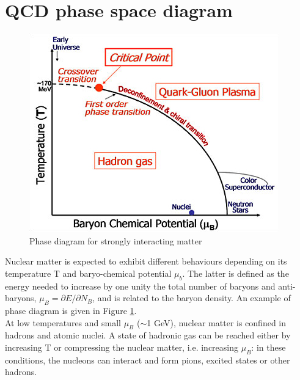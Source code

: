 \section{QCD phase space diagram}
%
\begin{figure}
  \centering
  \includegraphics[scale=0.5]{figures/phase.jpg}
  \caption{Phase diagram for strongly interacting matter}
  \label{fig:phase}
\end{figure}
%
Nuclear matter is expected to exhibit different behaviours depending on its temperature T and baryo-chemical potential $\mu_{b}$. The latter is defined
as the energy needed to increase by one unity the total number of baryons and anti-baryons, $\mu_{B}= \partial E / \partial N_{B}$, and is related to the baryon density. An example of phase diagram is given in Figure \ref{fig:phase}.\\ At low temperatures and small $\mu_{B}$ ($\sim$1 GeV), nuclear matter is confined in hadrons and atomic nuclei. A state of hadronic gas can be reached either by increasing T or compressing the nuclear matter, i.e. increasing $\mu_{B}$: in these conditions, the nucleons can interact and form pions, excited states or other hadrons.
